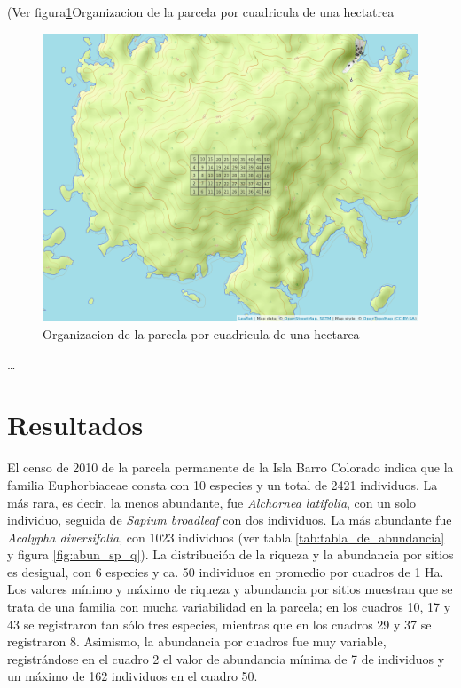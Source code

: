 \documentclass[11pt,]{article}
\begin{document}
(Ver figura\ref{fig:mapa_cuadros}Organizacion de la parcela por
cuadricula de una hectatrea

\begin{figure}
\centering
\includegraphics{mapa_cuadros.png}
\caption{\label{fig:mapa_cuadros}Organizacion de la parcela por
cuadricula de una hectarea}
\end{figure}

\ldots

\section{Resultados}\label{resultados}

El censo de 2010 de la parcela permanente de la Isla Barro Colorado
indica que la familia Euphorbiaceae consta con 10 especies y un total de
2421 individuos. La más rara, es decir, la menos abundante, fue
\emph{Alchornea latifolia}, con un solo individuo, seguida de
\emph{Sapium broadleaf} con dos individuos. La más abundante fue
\emph{Acalypha diversifolia}, con 1023 individuos (ver tabla
\ref{tab:tabla_de_abundancia} y figura \ref{fig:abun_sp_q}). La
distribución de la riqueza y la abundancia por sitios es desigual, con 6
especies y ca. 50 individuos en promedio por cuadros de 1 Ha. Los
valores mínimo y máximo de riqueza y abundancia por sitios muestran que
se trata de una familia con mucha variabilidad en la parcela; en los
cuadros 10, 17 y 43 se registraron tan sólo tres especies, mientras que
en los cuadros 29 y 37 se registraron 8. Asimismo, la abundancia por
cuadros fue muy variable, registrándose en el cuadro 2 el valor de
abundancia mínima de 7 de individuos y un máximo de 162 individuos en el
cuadro 50.
\end{document}
